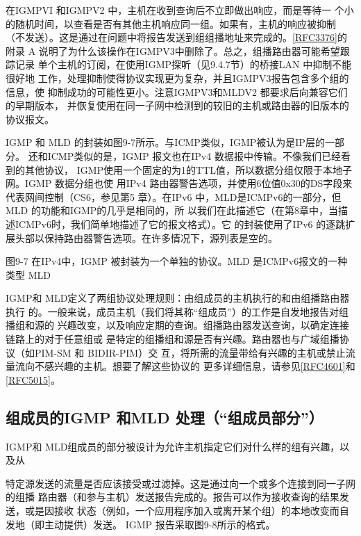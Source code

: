 \begin{tcolorbox}
    在IGMPVI 和IGMPV2 中，主机在收到查询后不立即做出响应，而是等待一
    个小的随机时间，以查看是否有其他主机响应同一组。如果有，主机的响应被抑制
    （不发送）。这是通过在问题中将报告发送到组组播地址来完成的。\href{https://www.rfc-editor.org/rfc/rfc3376}{[RFC3376]}的附录
    A 说明了为什么该操作在IGMPV3中删除了。总之，组播路由器可能希望跟踪记录
    单个主机的订阅，在使用IGMP探听（见9.4.7节）的桥接LAN 中抑制不能很好地
    工作，处理抑制使得协议实现更为复杂，并且IGMPV3报告包含多个组的信息，使
    抑制成功的可能性更小。注意IGMPV3和MLDV2 都要求后向兼容它们的早期版本，
    并恢复使用在同一子网中检测到的较旧的主机或路由器的旧版本的协议报文。
\end{tcolorbox}

IGMP 和 MLD 的封装如图9-7所示。与ICMP类似，IGMP被认为是IP层的一部分。
还和ICMP类似的是，IGMP 报文也在IPv4 数据报中传输。不像我们已经看到的其他协议，
IGMP使用一个固定的为1的TTL值，所以数据分组仅限于本地子网。IGMP 数据分组也使
用IPv4 路由器警告选项，并使用6位值0x30的DS字段来代表网间控制（CS6，参见第5
章）。在IPv6 中，MLD是ICMPv6的一部分，但 MLD 的功能和IGMP的几乎是相同的，所
以我们在此描述它（在第8章中，当描述ICMPv6时，我们简单地描述了它的报文格式）。它
的封装使用了IPv6 的逐跳扩展头部以保持路由器警告选项。在许多情况下，源列表是空的。

图9-7 在IPv4中，IGMP 被封装为一个单独的协议。MLD 是ICMPv6报文的一种类型
MLD


IGMP和 MLD定义了两组协议处理规则：由组成员的主机执行的和由组播路由器执行
的。一般来说，成员主机（我们将其称“组成员”）的工作是自发地报告对组播组和源的
兴趣改变，以及响应定期的查询。组播路由器发送查询，以确定连接链路上的对于任意组或
是特定的组播组和源是否有兴趣。路由器也与广域组播协议（如PIM-SM 和 BIDIR-PIM）交
互，将所需的流量带给有兴趣的主机或禁止流量流向不感兴趣的主机。想要了解这些协议的
更多详细信息，请参见\href{https://www.rfc-editor.org/rfc/rfc4601}{[RFC4601]}和 \href{https://www.rfc-editor.org/rfc/rfc5015}{[RFC5015]}。

\subsection{组成员的IGMP 和MLD 处理（“组成员部分”）}
IGMP和 MLD组成员的部分被设计为允许主机指定它们对什么样的组有兴趣，以及从

特定源发送的流量是否应该接受或过滤掉。这是通过向一个或多个连接到同一子网的组播
路由器（和参与主机）发送报告完成的。报告可以作为接收查询的结果发送，或是因接收
状态（例如，一个应用程序加入或离开某个组）的本地改变而自发地（即主动提供）发送。
IGMP 报告采取图9-8所示的格式。

